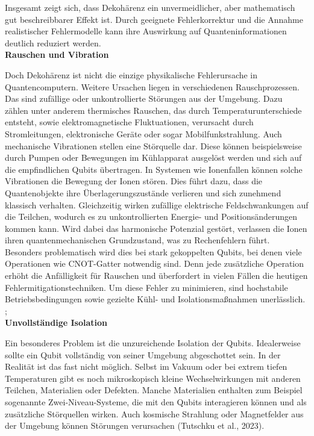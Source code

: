 Insgesamt zeigt sich, dass Dekohärenz  ein unvermeidlicher, aber mathematisch gut beschreibbarer Effekt ist. Durch geeignete Fehlerkorrektur und die Annahme realistischer Fehlermodelle kann ihre Auswirkung auf Quanteninformationen deutlich reduziert werden.  \cite[Seite 332-339]{rieffelQuantumComputingGentle2011a}\\


\textbf{Rauschen und Vibration}

Doch Dekohärenz ist nicht die einzige physikalische Fehlerursache in Quantencomputern. Weitere Ursachen liegen in verschiedenen Rauschprozessen. Das sind zufällige oder unkontrollierte Störungen aus der Umgebung. Dazu zählen unter anderem thermisches Rauschen, das durch Temperaturunterschiede entsteht, sowie elektromagnetische Fluktuationen, verursacht durch Stromleitungen, elektronische Geräte oder sogar Mobilfunkstrahlung. Auch mechanische Vibrationen stellen eine Störquelle dar. Diese können beispielsweise durch Pumpen oder Bewegungen im Kühlapparat ausgelöst werden und sich auf die empfindlichen Qubits übertragen. In Systemen wie Ionenfallen können solche Vibrationen die Bewegung der Ionen stören. Dies führt dazu, dass die Quantenobjekte ihre Überlagerungszustände verlieren und sich zunehmend klassisch verhalten. Gleichzeitig wirken zufällige elektrische Feldschwankungen auf die Teilchen, wodurch es zu unkontrollierten Energie- und Positionsänderungen kommen kann. Wird dabei das harmonische Potenzial gestört, verlassen die Ionen ihren quantenmechanischen Grundzustand, was zu Rechenfehlern führt. Besonders problematisch wird dies bei stark gekoppelten Qubits, bei denen viele Operationen wie CNOT-Gatter notwendig sind. Denn jede zusätzliche Operation erhöht die Anfälligkeit für Rauschen und überfordert in vielen Fällen die heutigen Fehlermitigationstechniken. Um diese Fehler zu minimieren, sind hochstabile Betriebsbedingungen sowie gezielte Kühl- und Isolationsmaßnahmen unerlässlich.\cite[Seite 39-43]{tutschku_quantencomputing_2023}\\;  \cite[Seite 353-356]{nielsen_quantum_2010}\\


\textbf{Unvollständige Isolation}

Ein besonderes Problem ist die unzureichende Isolation der Qubits. Idealerweise sollte ein Qubit vollständig von seiner Umgebung abgeschottet sein. In der Realität ist das fast nicht möglich. Selbst im Vakuum oder bei extrem tiefen Temperaturen gibt es noch mikroskopisch kleine Wechselwirkungen mit anderen Teilchen, Materialien oder Defekten. Manche Materialien enthalten zum Beispiel sogenannte Zwei-Niveau-Systeme, die mit den Qubits interagieren können und als zusätzliche Störquellen wirken. Auch kosmische Strahlung oder Magnetfelder aus der Umgebung können Störungen verursachen (Tutschku et al., 2023).

